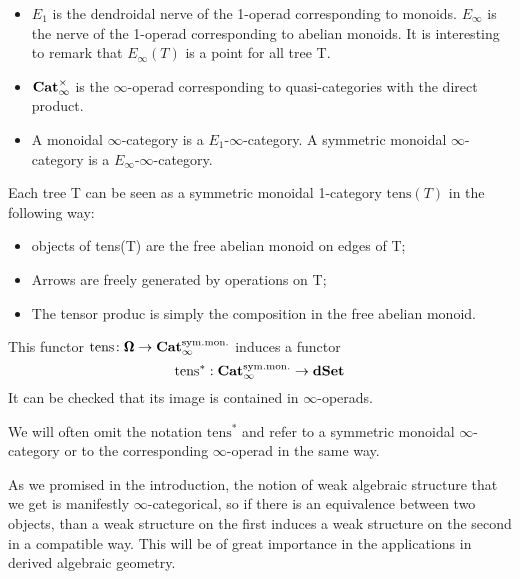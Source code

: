 \begin{refsection}
\begin{definition}
\begin{itemize}
	\item $E_1$ is the dendroidal nerve of the 1-operad corresponding to monoids. $E_{\infty}$ is the nerve of the 1-operad corresponding to abelian monoids. It is interesting to remark that $E_{\infty}(T)$ is a point for all tree T.

	\item $\mathbf{Cat}_{\infty}^{\times}$ is the $\infty$-operad corresponding to quasi-categories with the direct product.

	\item A monoidal $\infty$-category is a $E_1$-$\infty$-category. A symmetric monoidal $\infty$-category is a $E_{\infty}$-$\infty$-category. 
\end{itemize}
\end{definition}

\begin{proposition}
Each tree T can be seen as a symmetric monoidal 1-category $\mathrm{tens}(T)$ in the following way:
\begin{itemize}
	\item objects of tens(T) are the free abelian monoid on edges of T;

	\item Arrows are freely generated by operations on T;

	\item The tensor produc is simply the composition in the free abelian monoid.
\end{itemize}
This functor $\mathrm{tens} \colon \pmb{\Omega} \to \mathbf{Cat}_\infty^{\mathrm{sym. mon.}}$ induces a functor
\[
\mathrm{tens}^*: \mathbf{Cat}_{\infty}^{\mathrm{sym. mon.}} \to \mathbf{dSet}
\]
It can be checked that its image is contained in $\infty$-operads.

We will often omit the notation $\mathrm{tens}^*$ and refer to a symmetric monoidal $\infty$-category or to the corresponding $\infty$-operad in the same way.
\end{proposition}

\begin{remark}
As we promised in the introduction, the notion of weak algebraic structure that we get is manifestly $\infty$-categorical, so if there is an equivalence between two objects, than a weak structure on the first induces a weak structure on the second in a compatible way. This will be of great importance in the applications in derived algebraic geometry.
\end{remark}


\end{refsection}
